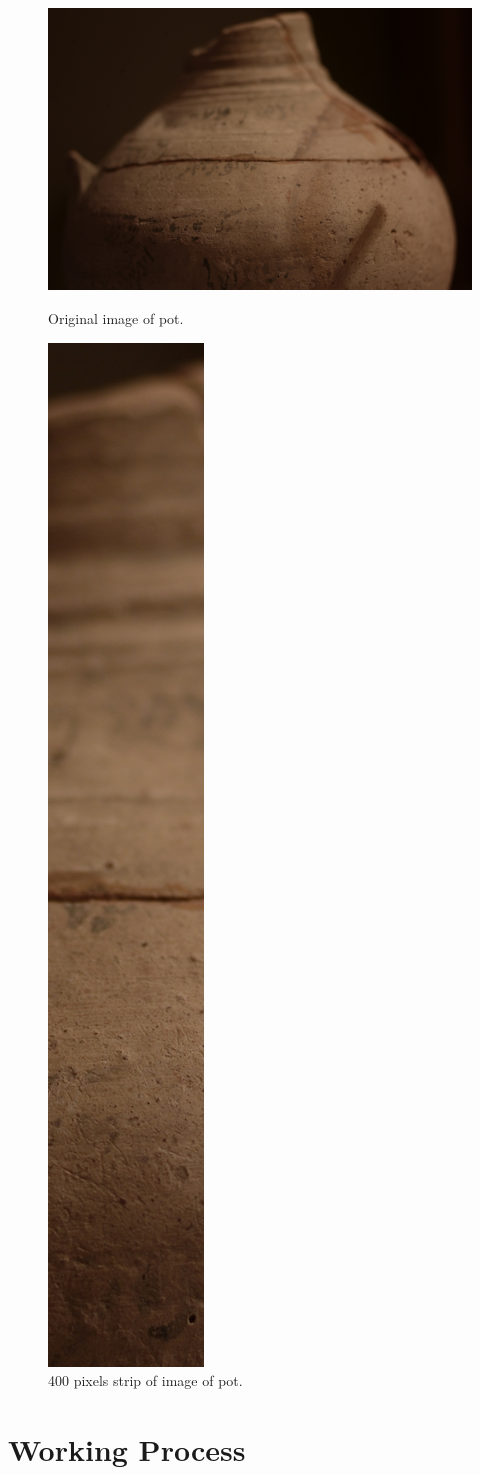 \documentclass[a4paper]{article}
\begin{document}
\begin{figure}[h]
\centering
\begin{minipage}{.45\textwidth}
  \centering
  \includegraphics[height=.7\linewidth]{L1019472.jpg}
  \caption{\label{fig:pot1}Original image of pot.}
\end{minipage}
\begin{minipage}{.45\textwidth}
  \centering
  \includegraphics[height=.7\linewidth]{L1019472_S400.jpg}
  \caption{\label{fig:strip1}400 pixels strip of image of pot.}
\end{minipage}
\end{figure}

\section{Working Process}
\end{document}
